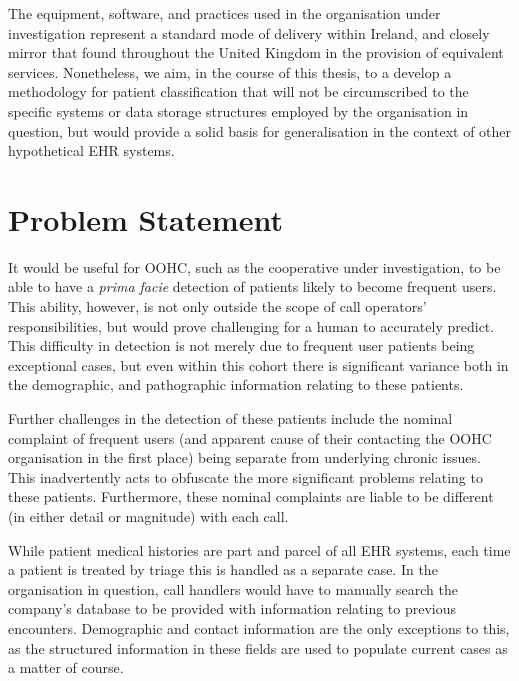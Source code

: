  The equipment, software, and practices used in the organisation under investigation represent a standard mode of delivery within Ireland, and closely mirror that found throughout the United Kingdom in the provision of equivalent services. Nonetheless, we aim, in the course of this thesis, to a develop a methodology for patient classification that will not be circumscribed to the specific systems or data storage structures employed by the organisation in question, but would provide a solid basis for generalisation in the context of other hypothetical EHR systems.  



\section{Problem Statement}
\label{section:problem-statement}

It would be useful for OOHC, such as the cooperative under investigation, to be able to have a \textit{prima facie} detection of patients likely to become frequent users. This ability, however, is not only outside the scope of call operators' responsibilities, but would prove challenging for a human to accurately predict. This difficulty in detection is not merely due to frequent user patients being exceptional cases, but even within this cohort there is significant variance both in the demographic, and pathographic information relating to these patients. 

Further challenges in the detection of these patients include the nominal complaint of frequent users (and apparent cause of their contacting the OOHC organisation in the first place) being separate from underlying chronic issues. This inadvertently acts to obfuscate the more significant problems relating to these patients. Furthermore, these nominal complaints are liable to be different (in either detail or magnitude) with each call. 

While patient medical histories are part and parcel of all EHR systems, each time a patient is treated by triage this is handled as a separate case. In the organisation in question, call handlers would have to manually search the company's database to be provided with information relating to previous encounters. Demographic and contact information are the only exceptions to this, as the structured information in these fields are used to populate current cases as a matter of course.

